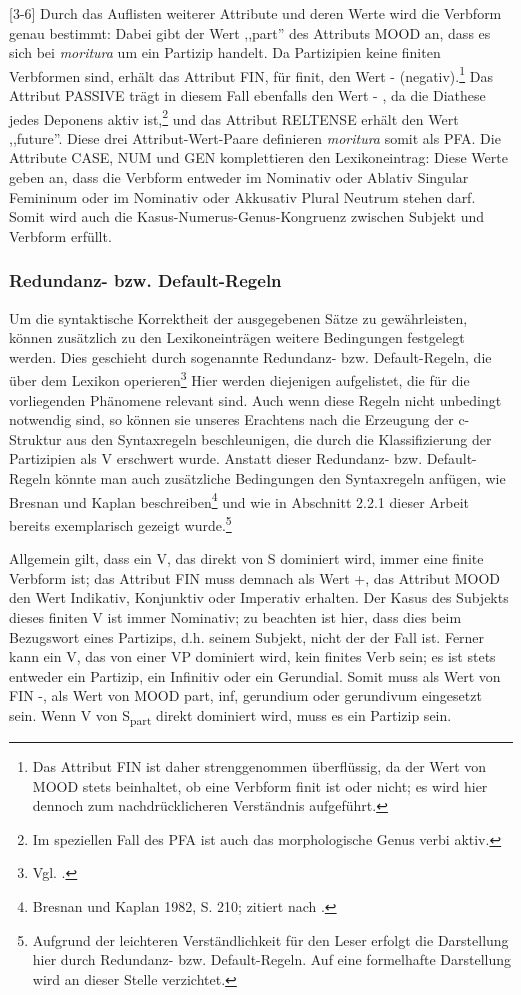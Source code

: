 \documentclass[12pt,a4paper]{article}
\begin{document}
[3-6] Durch das Auflisten weiterer Attribute und deren Werte wird die Verbform genau bestimmt: Dabei gibt der Wert ,,part'' des Attributs MOOD an, dass es sich bei \textit{moritura} um ein Partizip handelt. Da Partizipien keine finiten Verbformen sind, erhält das Attribut FIN, für finit, den Wert - (negativ).\footnote{Das Attribut FIN ist daher strenggenommen überflüssig, da der Wert von MOOD stets beinhaltet, ob eine Verbform finit ist oder nicht; es wird hier dennoch zum nachdrücklicheren Verständnis aufgeführt.} Das Attribut PASSIVE trägt in diesem Fall ebenfalls den Wert - , da die Diathese jedes Deponens aktiv ist,\footnote{Im speziellen Fall des PFA ist auch das morphologische Genus verbi aktiv.} und das Attribut RELTENSE erhält den Wert ,,future''. Diese drei Attribut-Wert-Paare definieren \textit{moritura} somit als PFA. Die Attribute CASE, NUM und GEN komplettieren den Lexikoneintrag: Diese Werte geben an, dass die Verbform entweder im Nominativ oder Ablativ Singular Femininum oder im Nominativ oder Akkusativ Plural Neutrum stehen darf. Somit wird auch die Kasus-Numerus-Genus-Kongruenz zwischen Subjekt und Verbform erfüllt.

\subsubsection{Redundanz- bzw. Default-Regeln}
Um die syntaktische Korrektheit der ausgegebenen Sätze zu gewährleisten, können zusätzlich zu den Lexikoneinträgen weitere Bedingungen festgelegt werden. Dies geschieht durch sogenannte Redundanz- bzw. Default-Regeln, die über dem Lexikon operieren\footnote{Vgl. \cite[23-4]{Rohrer}.} Hier werden diejenigen aufgelistet, die für die vorliegenden Phänomene relevant sind. Auch wenn diese Regeln nicht unbedingt notwendig sind, so können sie unseres Erachtens nach die Erzeugung der c-Struktur aus den Syntaxregeln beschleunigen, die durch die Klassifizierung der Partizipien als V erschwert wurde. Anstatt dieser Redundanz- bzw. Default-Regeln könnte man auch zusätzliche Bedingungen den Syntaxregeln anfügen, wie Bresnan und Kaplan beschreiben\footnote{Bresnan und Kaplan 1982, S. 210; zitiert nach \cite[54]{Rohrer}.} und wie in Abschnitt 2.2.1 dieser Arbeit bereits exemplarisch gezeigt wurde.\footnote{Aufgrund der leichteren Verständlichkeit für den Leser erfolgt die Darstellung hier durch Redundanz- bzw. Default-Regeln. Auf eine formelhafte Darstellung wird an dieser Stelle verzichtet.}

Allgemein gilt, dass ein V, das direkt von S dominiert wird, immer eine
finite Verbform ist; das Attribut FIN muss demnach als Wert +, das Attribut MOOD den Wert Indikativ, Konjunktiv oder Imperativ erhalten.
Der Kasus des Subjekts dieses finiten V ist immer Nominativ; zu beachten ist hier, dass dies beim Bezugswort eines Partizips, d.h. seinem Subjekt, nicht der der Fall ist.
Ferner kann ein V, das von einer VP dominiert wird, kein finites Verb sein; es ist stets entweder ein Partizip, ein Infinitiv oder ein Gerundial. Somit muss als Wert von FIN -, als Wert von MOOD part, inf, gerundium  oder gerundivum eingesetzt sein.
Wenn V von S\textsubscript{part} direkt dominiert wird, muss es ein Partizip sein.
\end{document}
